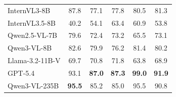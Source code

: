 \begin{table}[t]
\begin{tabular}{lccccc}
InternVL3-8B & 87.8 & 77.1 & 77.8 & 80.5 & 81.3 \\
InternVL3.5-8B & 40.2 & 54.1 & 63.4 & 60.9 & 53.8 \\
Qwen2.5-VL-7B & 79.6 & 72.4 & 73.2 & 65.5 & 73.1 \\
Qwen3-VL-8B & 82.6 & 79.9 & 76.2 & 81.4 & 80.2 \\
Llama-3.2-11B-V & 69.7 & 70.8 & 71.8 & 63.8 & 68.9 \\
GPT-5.4 & 93.1 & \textbf{87.0} & \textbf{87.3} & \textbf{99.0} & \textbf{91.9} \\
Qwen3-VL-235B & \textbf{95.5} & 85.2 & 85.0 & 95.5 & 90.8 \\
\bottomrule
\end{tabular}
\end{table}